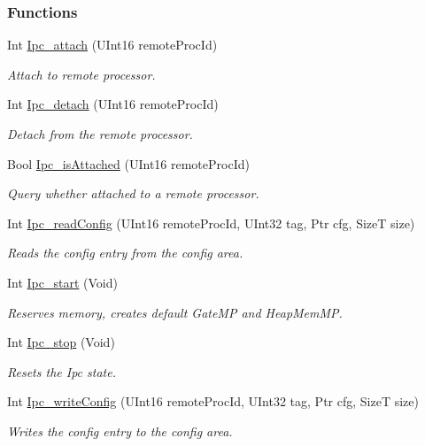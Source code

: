 \subsubsection*{Functions}
\begin{DoxyCompactItemize}
\item 
Int \hyperlink{_ipc_8h_a170f84915df79377080be708302bcb08}{Ipc\-\_\-attach} (U\-Int16 remote\-Proc\-Id)
\begin{DoxyCompactList}\small\item\em Attach to remote processor. \end{DoxyCompactList}\item 
Int \hyperlink{_ipc_8h_abd0bc0fb5d84415b441c7050f92826c0}{Ipc\-\_\-detach} (U\-Int16 remote\-Proc\-Id)
\begin{DoxyCompactList}\small\item\em Detach from the remote processor. \end{DoxyCompactList}\item 
Bool \hyperlink{_ipc_8h_a6c17c41b2d25e8b69208082126cde887}{Ipc\-\_\-is\-Attached} (U\-Int16 remote\-Proc\-Id)
\begin{DoxyCompactList}\small\item\em Query whether attached to a remote processor. \end{DoxyCompactList}\item 
Int \hyperlink{_ipc_8h_a4a5c82ebf2441ebf3fa86e6e7dc917d7}{Ipc\-\_\-read\-Config} (U\-Int16 remote\-Proc\-Id, U\-Int32 tag, Ptr cfg, Size\-T size)
\begin{DoxyCompactList}\small\item\em Reads the config entry from the config area. \end{DoxyCompactList}\item 
Int \hyperlink{_ipc_8h_aca550c6a5498637cfec7b0f4e6d07828}{Ipc\-\_\-start} (Void)
\begin{DoxyCompactList}\small\item\em Reserves memory, creates default Gate\-M\-P and Heap\-Mem\-M\-P. \end{DoxyCompactList}\item 
Int \hyperlink{_ipc_8h_ae47b1d9fa8486f162c836f142f0ab2ee}{Ipc\-\_\-stop} (Void)
\begin{DoxyCompactList}\small\item\em Resets the Ipc state. \end{DoxyCompactList}\item 
Int \hyperlink{_ipc_8h_af3b2fb0c66ad86f148870202b1b7aca1}{Ipc\-\_\-write\-Config} (U\-Int16 remote\-Proc\-Id, U\-Int32 tag, Ptr cfg, Size\-T size)
\begin{DoxyCompactList}\small\item\em Writes the config entry to the config area. \end{DoxyCompactList}\end{DoxyCompactItemize}


